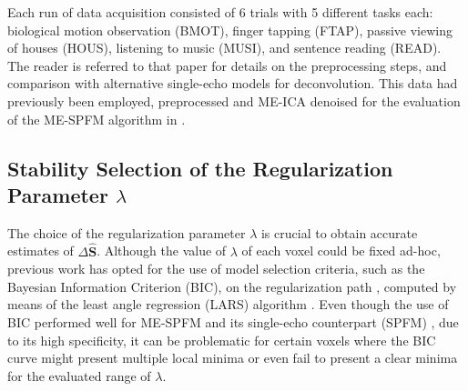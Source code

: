 Each run of data acquisition consisted of 6 trials with 5 different tasks each:
biological motion observation (BMOT), finger tapping (FTAP), passive viewing of
houses (HOUS), listening to music (MUSI), and sentence reading (READ). The
reader is referred to that paper for details on the preprocessing steps, and
comparison with alternative single-echo models for deconvolution. This data had
previously been employed, preprocessed and ME-ICA denoised for the evaluation of
the ME-SPFM algorithm in \citep{CaballeroGaudes2019deconvolutionalgorithmmulti}.

\subsection{Stability Selection of the Regularization Parameter $\lambda$}
\label{sec:multivariate_stability_selection}

The choice of the regularization parameter $\lambda$ is crucial to obtain
accurate estimates of $\Delta \hat{\mathbf{S}}$. Although the value of $\lambda$
of each voxel could be fixed ad-hoc, previous work has opted for the use of
model selection criteria, such as the Bayesian Information Criterion (BIC), on
the regularization path \citep{CaballeroGaudes2019deconvolutionalgorithmmulti},
computed by means of the least angle regression (LARS) algorithm
\citep{Efron2004Leastangleregression}. Even though the use of BIC performed well
for ME-SPFM \citep{CaballeroGaudes2019deconvolutionalgorithmmulti} and its
single-echo counterpart (SPFM) \citep{Gaudes2013Paradigmfreemapping}, due to its
high specificity, it can be problematic for certain voxels where the BIC curve
might present multiple local minima or even fail to present a clear minima for
the evaluated range of $\lambda$.

